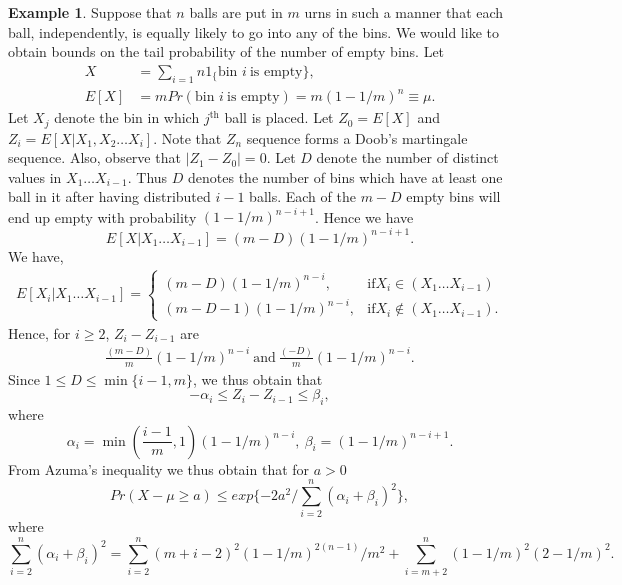 \documentclass[a4paper,10pt]{article}
\theoremstyle{plain}
\theoremstyle{definition}
\newtheorem{exmp}[thm]{Example}
\theoremstyle{remark}
\begin{document}
\begin{exmp}
Suppose that $n$ balls are put in $m$ urns in such a manner that each ball, independently, is equally likely to go into any of the bins. We would like to obtain bounds on the tail probability of the number of empty bins. Let
\begin{eqnarray*}
X&=\sum_{i=1}{n}1_\{\text{bin~} i~\text{is empty}\},\\
E[X]&=mPr(\text{bin~} i~\text{is empty})=m(1-1/m)^n \equiv \mu. 
\end{eqnarray*}
Let $X_j$ denote the bin in which $j^{\text{th}}$ ball is placed. Let $Z_0=E[X]$ and $Z_i=E[X|X_1,X_2 \hdots X_i]$. Note that $Z_n$ sequence forms a Doob's martingale sequence. Also, observe that $|Z_1-Z_0|=0$. Let $D$ denote the number of distinct values in $X_1 \hdots X_{i-1}$. Thus $D$ denotes the number of bins which have at least one  ball in it after having distributed $i-1$ balls. Each of the $m-D$ empty bins will end up empty with probability $(1-1/m)^{n-i+1}$. Hence we have
\begin{equation*}
E[X|X_1 \hdots X_{i-1}]=(m-D)(1-1/m)^{n-i+1}.
\end{equation*}
We have,
\begin{eqnarray*}
E[X_i|X_1 \hdots X_{i-1}] =
\begin{cases}
(m-D)(1-1/m)^{n-i}, & \text{if} X_i \in (X_1 \hdots X_{i-1}) \\
(m-D-1)(1-1/m)^{n-i} , & \text{if} X_i \notin (X_1 \hdots X_{i-1}).
\end{cases}
\end{eqnarray*}
Hence, for $i \geq 2$, $Z_i-Z_{i-1}$ are
\begin{eqnarray*}
\frac{(m-D)}{m}(1-1/m)^{n-i} ~\text{and}~ \frac{(-D)}{m}(1-1/m)^{n-i}.
\end{eqnarray*}
Since $1 \leq D \leq \min\{i-1,m\}$, we thus obtain that 
\begin{equation*}
-\alpha_i \leq Z_i-Z_{i-1} \leq \beta_i,
\end{equation*}
where
\begin{equation*}
\alpha_i =\min(\frac{i-1}{m},1)(1-1/m)^{n-i},~\beta_i=(1-1/m)^{n-i+1}.
\end{equation*}
From Azuma's inequality we thus obtain that for $a>0$
\begin{equation*}
Pr(X-\mu \geq a) \leq exp\{-2a^2/\sum_{i=2}^n(\alpha_i+\beta_i)^2\},
\end{equation*}
where 
\begin{equation*}
\sum_{i=2}^{n}(\alpha_i+\beta_i)^2=\sum_{i=2}^{n}(m+i-2)^2(1-1/m)^{2(n-1)}/m^2+\sum_{i=m+2}^{n}(1-1/m)^2(2-1/m)^2.
\end{equation*}
\end{exmp}
\end{document}
